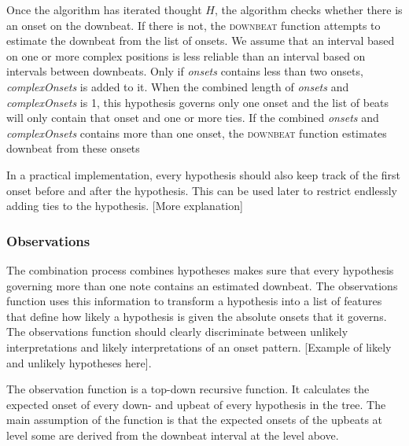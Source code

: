 Once the algorithm has iterated thought $H$, the algorithm checks whether there is an onset on the downbeat. If there is not, the \textsc{downbeat} function attempts to estimate the downbeat from the list of onsets. We assume that an interval based on one or more complex positions is less reliable than an interval based on intervals between downbeats. Only if \textit{onsets} contains less than two onsets, \textit{complexOnsets} is added to it. When the combined length of \textit{onsets} and \textit{complexOnsets} is 1, this hypothesis governs only one onset and the list of beats will only contain that onset and one or more ties. If the combined \textit{onsets} and \textit{complexOnsets} contains more than one onset, the \textsc{downbeat} function estimates downbeat from these onsets

In a practical implementation, every hypothesis should also keep track of the first onset before and after the hypothesis. This can be used later to restrict endlessly adding ties to the hypothesis. [More explanation]

\subsubsection{Observations}

The combination process combines hypotheses makes sure that every hypothesis governing more than one note contains an estimated downbeat. The observations function uses this information to transform a hypothesis into a list of features that define how likely a hypothesis is given the absolute onsets that it governs. The observations function should clearly discriminate between unlikely interpretations and likely interpretations of an onset pattern. [Example of likely and unlikely hypotheses here].

The observation function is a top-down recursive function. It calculates the expected onset of every down- and upbeat of every hypothesis in the tree. The main assumption of the function is that the expected onsets of the upbeats at level some are derived from the downbeat interval at the level above. 

